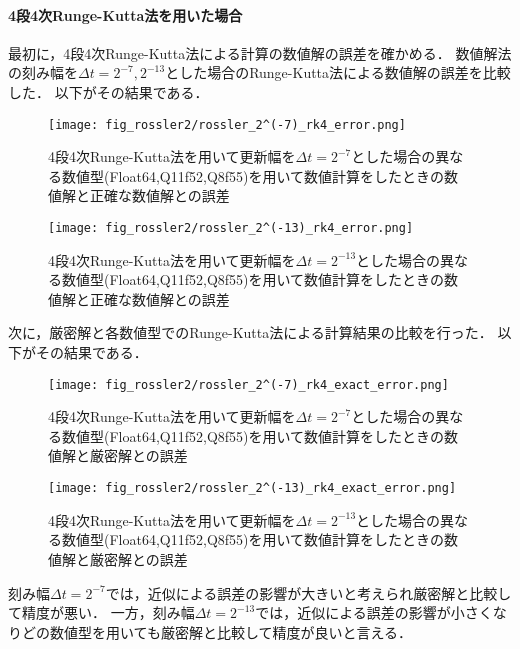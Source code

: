 \paragraph*{4段4次Runge-Kutta法を用いた場合}
最初に，4段4次Runge-Kutta法による計算の数値解の誤差を確かめる．
数値解法の刻み幅を$\Delta t = 2^{-7},2^{-13}$とした場合のRunge-Kutta法による数値解の誤差を比較した．
以下がその結果である．
\begin{figure}[H]
    \centering
    \begin{minipage}[b]{0.49\columnwidth}
        \centering
        \texttt{[image: fig\_rossler2/rossler\_2^(-7)\_rk4\_error.png]}
        \caption{4段4次Runge-Kutta法を用いて更新幅を$\Delta t = 2^{-7}$とした場合の異なる数値型(Float64,Q11f52,Q8f55)を用いて数値計算をしたときの数値解と正確な数値解との誤差}
        \label{fig:rossler_2^(-7)_rk4_error}
    \end{minipage}
    \begin{minipage}[b]{0.49\columnwidth}
        \centering
        \texttt{[image: fig\_rossler2/rossler\_2^(-13)\_rk4\_error.png]}
        \caption{4段4次Runge-Kutta法を用いて更新幅を$\Delta t =  2^{-13}$とした場合の異なる数値型(Float64,Q11f52,Q8f55)を用いて数値計算をしたときの数値解と正確な数値解との誤差}
        \label{fig:rossler_2^(-13)_rk4_error}
    \end{minipage}   
\end{figure}


次に，厳密解と各数値型でのRunge-Kutta法による計算結果の比較を行った．
以下がその結果である．\\
\begin{figure}[H]
    \centering
    \begin{minipage}[b]{0.49\columnwidth}
        \centering
        \texttt{[image: fig\_rossler2/rossler\_2^(-7)\_rk4\_exact\_error.png]}
        \caption{4段4次Runge-Kutta法を用いて更新幅を$\Delta t = 2^{-7}$とした場合の異なる数値型(Float64,Q11f52,Q8f55)を用いて数値計算をしたときの数値解と厳密解との誤差}   
        \label{fig:rossler_2^(-7)_rk4_exact_error}
    \end{minipage}
    \begin{minipage}[b]{0.49\columnwidth}
        \centering
        \texttt{[image: fig\_rossler2/rossler\_2^(-13)\_rk4\_exact\_error.png]}
        \caption{4段4次Runge-Kutta法を用いて更新幅を$\Delta t =  2^{-13}$とした場合の異なる数値型(Float64,Q11f52,Q8f55)を用いて数値計算をしたときの数値解と厳密解との誤差}
        \label{fig:rossler_2^(-13)_rk4_exact_error}
    \end{minipage}
\end{figure}
刻み幅$\Delta t = 2^{-7}$では，近似による誤差の影響が大きいと考えられ厳密解と比較して精度が悪い．
一方，刻み幅$\Delta t =  2^{-13}$では，近似による誤差の影響が小さくなりどの数値型を用いても厳密解と比較して精度が良いと言える．

